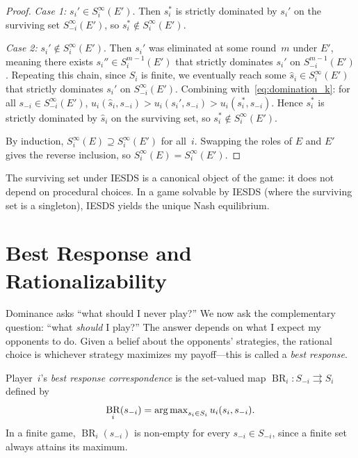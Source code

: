 \documentclass[11pt,a4paper]{article}
\DeclareMathOperator{\BR}{BR}
\begin{document}
\begin{proof}
\emph{Case 1:} $s_i' \in S_i^\infty(E')$.  Then $s_i^*$ is strictly
dominated by $s_i'$ on the surviving set $S_{-i}^\infty(E')$, so
$s_i^* \notin S_i^\infty(E')$.

\emph{Case 2:} $s_i' \notin S_i^\infty(E')$.  Then $s_i'$ was eliminated at
some round~$m$ under $E'$, meaning there exists
$s_i'' \in S_i^{m-1}(E')$ that strictly dominates $s_i'$ on
$S_{-i}^{m-1}(E')$.  Repeating this chain, since $S_i$ is finite, we
eventually reach some $\hat{s}_i \in S_i^\infty(E')$ that strictly dominates
$s_i'$ on $S_{-i}^\infty(E')$.  Combining with~\eqref{eq:domination_k}:
for all $s_{-i} \in S_{-i}^\infty(E')$,
$u_i(\hat{s}_i, s_{-i}) > u_i(s_i', s_{-i}) > u_i(s_i^*, s_{-i})$.
Hence $s_i^*$ is strictly dominated by $\hat{s}_i$ on the surviving set,
so $s_i^* \notin S_i^\infty(E')$.

\medskip
By induction, $S_i^\infty(E) \supseteq S_i^\infty(E')$ for all~$i$.
Swapping the roles of $E$ and $E'$ gives the reverse inclusion, so
$S_i^\infty(E) = S_i^\infty(E')$.
\end{proof}

\begin{keyresult}
The surviving set under IESDS is a canonical object of the game: it does not
depend on procedural choices.  In a game solvable by IESDS (where the
surviving set is a singleton), IESDS yields the unique Nash equilibrium.
\end{keyresult}


\section{Best Response and Rationalizability}
\label{sec:rationalizability}

Dominance asks ``what should I never play?''  We now ask the complementary
question: ``what \emph{should} I play?''  The answer depends on what I
expect my opponents to do.  Given a belief about the opponents' strategies,
the rational choice is whichever strategy maximizes my payoff---this is
called a \emph{best response}.

\begin{definition}
\label{def:best_response}
Player~$i$'s \emph{best response correspondence} is the set-valued map
$\BR_i \colon S_{-i} \rightrightarrows S_i$ defined by
\[
    \BR_i(s_{-i}) = \argmax_{s_i \in S_i} u_i(s_i, s_{-i}).
\]
In a finite game, $\BR_i(s_{-i})$ is non-empty for every
$s_{-i} \in S_{-i}$, since a finite set always attains its maximum.
\end{definition}
\end{document}
